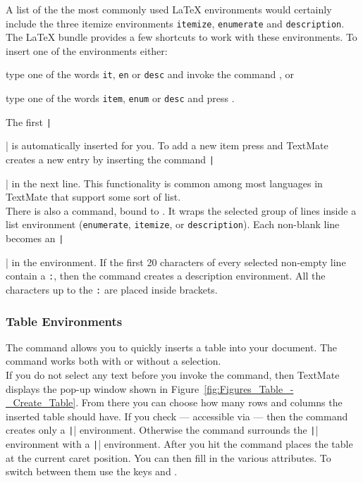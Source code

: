 \documentclass[11pt, x11names]{article}
\begin{document}
A list of the the most commonly used LaTeX environments would certainly include the three itemize environments \texttt{itemize}, \texttt{enumerate} and \texttt{description}. The LaTeX bundle provides a few shortcuts to work with these environments. To insert one of the environments either:

\begin{enumerate}

  \begin{sloppypar}
  \item type one of the words \texttt{it}, \texttt{en} or \texttt{desc} and invoke the command , or
  \end{sloppypar}

  \item type one of the words \texttt{item}, \texttt{enum} or \texttt{desc} and press \keys{\tab}.

\end{enumerate}

The first \texttt|\item| is automatically inserted for you. To add a new item press \keys{\enter} and TextMate creates a new entry by inserting the command \texttt|\item| in the next line. This functionality is common among most languages in TextMate that support some sort of list.\\

There is also a  command, bound to . It wraps the selected group of lines inside a list environment (\texttt{enumerate}, \texttt{itemize}, or \texttt{description}). Each non-blank line becomes an \texttt|\item| in the environment. If the first 20 characters of every selected non-empty line contain a \texttt{:}, then the command creates a description environment. All the characters up to the \texttt{:} are placed inside brackets.

\subsubsection{Table Environments}

The command  allows you to quickly inserts a table into your document. The command works both with or without a selection.\\

If you do not select any text before you invoke the command, then TextMate displays the pop-up window shown in Figure~\ref{fig:Figures_Table_-_Create_Table}. From there you can choose how many rows and columns the inserted table should have. If you check  — accessible via  — then the command creates only a \texttt|\tabular| environment. Otherwise the command surrounds the \texttt|\tabular| environment with a \texttt|\table| environment. After you hit  the command places the table at the current caret position. You can then fill in the various attributes. To switch between them use the keys \keys{\tab} and \keys{\shift + \tab}.
\end{document}
